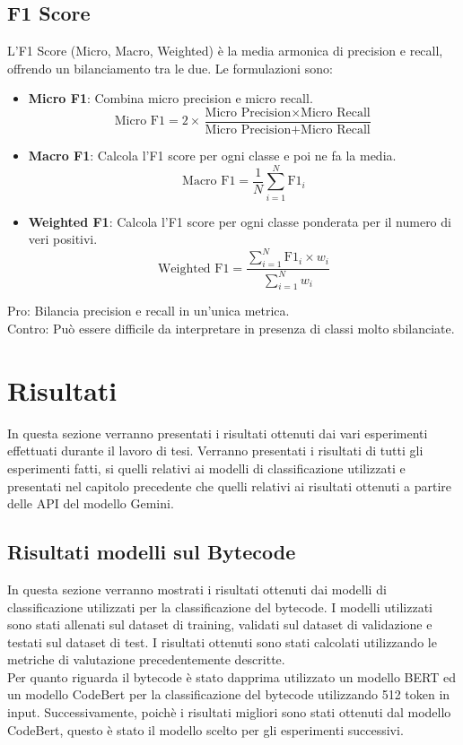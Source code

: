 \documentclass[../../Thesis.tex]{subfiles}
\begin{document}
\subsection*{F1 Score}
L'F1 Score (Micro, Macro, Weighted) è la media armonica di precision e recall, offrendo un bilanciamento tra le due. Le formulazioni sono:
\begin{itemize}
    \item \textbf{Micro F1}: Combina micro precision e micro recall.
    $$ \text{Micro F1} = 2 \times \frac{\text{Micro Precision} \times \text{Micro Recall}}{\text{Micro Precision} + \text{Micro Recall}} $$
    \item \textbf{Macro F1}: Calcola l'F1 score per ogni classe e poi ne fa la media.
    $$ \text{Macro F1} = \frac{1}{N} \sum_{i=1}^{N} \text{F1}_i $$
    \item \textbf{Weighted F1}: Calcola l'F1 score per ogni classe ponderata per il numero di veri positivi.
    $$ \text{Weighted F1} = \frac{\sum_{i=1}^{N} \text{F1}_i \times w_i}{\sum_{i=1}^{N} w_i} $$
\end{itemize}
Pro: Bilancia precision e recall in un'unica metrica.\\
Contro: Può essere difficile da interpretare in presenza di classi molto sbilanciate.

\section{Risultati}
In questa sezione verranno presentati i risultati ottenuti dai vari esperimenti effettuati durante il lavoro di tesi. Verranno presentati i risultati di tutti gli esperimenti fatti, si quelli relativi ai modelli di classificazione utilizzati e presentati nel capitolo precedente che quelli relativi ai risultati ottenuti a partire delle API del modello Gemini. 
\subsection{Risultati modelli sul Bytecode}
In questa sezione verranno mostrati i risultati ottenuti dai modelli di classificazione utilizzati per la classificazione del bytecode. I modelli utilizzati sono stati allenati sul dataset di training, validati sul dataset di validazione e testati sul dataset di test. I risultati ottenuti sono stati calcolati utilizzando le metriche di valutazione precedentemente descritte.\\
Per quanto riguarda il bytecode è stato dapprima utilizzato un modello BERT ed un modello CodeBert per la classificazione del bytecode utilizzando 512 token in input. Successivamente, poichè i risultati migliori sono stati ottenuti dal modello CodeBert, questo è stato il modello scelto per gli esperimenti successivi.\\
\end{document}
